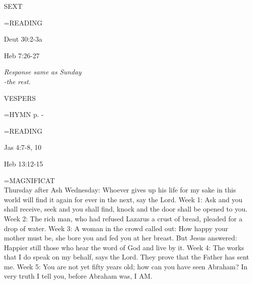 \begin{flushleft}\normalsize SEXT\\\end{flushleft}

\hangindent=\parindent \small READING
\begin{description}[labelindent=\parindent, leftmargin=*]
\item [Thursday after Ash Wednesday \& Weeks 1-4:]     Deut 30:2-3a \textbf{    }
\item [Week 5:]     Heb 7:26-27 \textbf{    }
\end{description}


\begin{center}
\textit{Response same as Sunday\\
-the rest.}
\end{center}

\begin{flushleft}\normalsize VESPERS\\\end{flushleft}

\hangindent=\parindent \small{\uppercase{HYMN} p.  \pageref{lent:firstHymn} - \pageref{lent:lastHymn}\\}

\hangindent=\parindent \small READING
\begin{description}[labelindent=\parindent, leftmargin=*]
\item [Thursday after Ash Wednesday \& Weeks 1-4:]     Jas 4:7-8, 10 \textbf{    }
\item [Week 5:]     Heb 13:12-15 \textbf{    }
\end{description}

\hangindent=\parindent \small{MAGNIFICAT \\}
Thursday after Ash Wednesday:	Whoever gives up his life for my sake in this world will find it again for ever in the next, say the Lord.
Week 1:	Ask and you shall receive, seek and you shall find, knock and the door shall be opened to you.
Week 2:	The rich man, who had refused Lazarus a crust of bread, pleaded for a drop of water.
Week 3:	A woman in the crowd called out: How happy your mother must be, she bore you and fed you at her breast. But Jesus answered: Happier still those who hear the word of God and live by it.
Week 4:	The works that I do speak on my behalf, says the Lord. They prove that the Father has sent me.
Week 5:	You are not yet fifty years old; how can you have seen Abraham? In very truth I tell you, before Abraham was, I AM.
